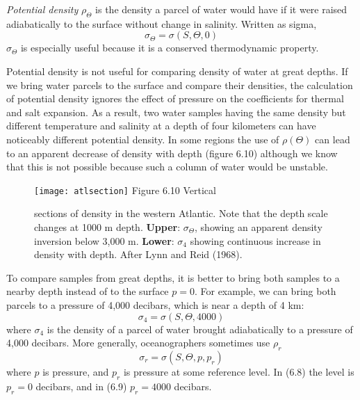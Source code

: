 \textit{Potential density} $\rho _{\Theta}$ is the density a parcel of water would have if it were raised adiabatically to the surface without change in salinity. Written as sigma,
\begin{equation}
\sigma _{\Theta} = \sigma(S, \Theta, 0)
\end{equation}
$\sigma _{\Theta}$ is especially useful because it is a conserved thermodynamic property.

Potential density is not useful for comparing density of water at great depths. If we bring water parcels to the surface and compare their densities, the calculation of potential density ignores the effect of pressure on the coefficients for thermal and salt expansion. As a result, two water samples having the same density but different temperature and salinity at a depth of four kilometers can have noticeably different potential density. In some regions the use of $\rho(\Theta)$ can lead to an apparent decrease of density with depth (figure 6.10) although we know that this is not possible because such a column of water would be unstable.

\begin{figure}[b!]
\vspace{-2ex}
\texttt{[image: atlsection]}
\footnotesize
Figure 6.10 Vertical \rule{0mm}{4ex}sections of density in the western Atlantic.
Note that the depth scale changes at 1000 m depth. \textbf{Upper}: $\sigma
_{\Theta}$, showing an apparent density inversion below 3,000 m. \textbf{Lower}:
$\sigma _4$ showing continuous increase in density with depth. After Lynn and Reid
(1968).
\label{fig:atlsection4}
\end{figure}

To compare samples from great depths, it is better to bring both samples to a nearby depth instead of to the surface $p = 0$. For example, we can bring both parcels to a pressure of 4,000 decibars, which is near a depth of 4 km:
\begin{equation}
\sigma_4 = \sigma(S, \Theta, 4000)
\end{equation}
where $\sigma_4$ is the density of a parcel of water brought adiabatically to a pressure of 4,000 decibars. More generally, oceanographers sometimes use $\rho_r$
\begin{equation}
\sigma _r = \sigma(S, \Theta, p, p_r)
\end{equation}
where $p$ is pressure, and $p_r$ is pressure at some reference level. In (6.8) the level is $p_r = 0$ decibars, and in (6.9) $p_r = 4000$ decibars.

